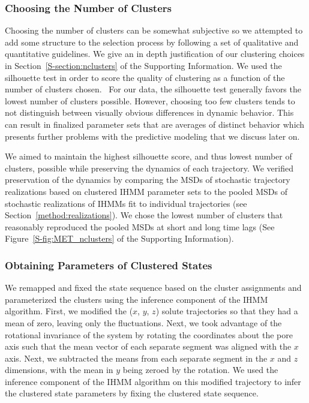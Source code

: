 \documentclass[journal=jpcbfk,manuscript=article]{achemso}
\begin{document}
  \subsubsection*{Choosing the Number of Clusters}

  Choosing the number of clusters can be somewhat subjective so we attempted to add some
  structure to the selection process by following a set of qualitative and quantitative 
  guidelines. We give an in depth justification of our clustering choices in 
  Section~\ref{S-section:nclusters} of the Supporting Information. We used the silhouette
  test in order to score the quality of clustering as a function of the number of clusters
  chosen.~\cite{kaufman_finding_2009} For our data, the silhouette test generally favors 
  the lowest number of clusters possible. However, choosing too few clusters tends to not
  distinguish between visually obvious differences in dynamic behavior. This can result 
  in finalized parameter sets that are averages of distinct behavior which presents 
  further problems with the predictive modeling that we discuss later on. 
  
  We aimed to maintain the highest silhouette score, and thus lowest number of clusters,
  possible while preserving the dynamics of each trajectory.
  We verified preservation of the dynamics by comparing the MSDs of stochastic trajectory
  realizations based on clustered IHMM parameter sets to the pooled MSDs of stochastic 
  realizations of IHMMs fit to individual trajectories (see Section~\ref{method:realizations}).
  We chose the lowest number of clusters that reasonably reproduced the pooled MSDs at 
  short and long time lags (See Figure~\ref{S-fig:MET_nclusters} of the Supporting 
  Information).

  \subsubsection*{Obtaining Parameters of Clustered States}
  

  We remapped and fixed the state sequence based on the cluster assignments and 
  parameterized the clusters using the inference component of the IHMM algorithm.
  First, we modified the ($x$, $y$, $z$) solute trajectories so that they had a 
  mean of zero, leaving only the fluctuations. Next, we took advantage of the
  rotational invariance of the system by rotating the coordinates about the pore 
  axis such that the mean vector of each separate segment was aligned with the 
  $x$ axis. Next, we subtracted the means from each separate segment in the $x$ 
  and $z$ dimensions, with the mean in $y$ being zeroed by the rotation. We used
  the inference component of the IHMM algorithm on this modified trajectory to 
  infer the clustered state parameters by fixing the clustered state sequence.
  
\end{document}
